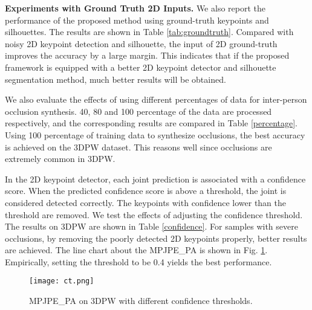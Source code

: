 \documentclass[journal]{IEEEtran}
\begin{document}
\noindent\textbf{Experiments with Ground Truth 2D Inputs.}  We also report the performance of the proposed method using ground-truth keypoints and silhouettes. The results are shown in Table \ref{tab:groundtruth}. Compared with noisy 2D keypoint detection and silhouette,  the input of 2D ground-truth improves the accuracy by a large margin. This indicates that if the proposed framework is equipped with a better 2D keypoint detector and silhouette segmentation method, much better results will be obtained.

We also evaluate the effects of using different percentages of data for inter-person occlusion synthesis. 40, 80 and 100 percentage of the data are processed respectively, and the corresponding results are compared in Table \ref{percentage}. Using 100 percentage of training data to synthesize occlusions, the best accuracy is achieved on the 3DPW dataset. This reasons well since occlusions are extremely common in 3DPW.

In the 2D keypoint detector, each joint prediction is associated with a confidence score. When the predicted confidence score is above a threshold, the joint is considered detected correctly. The keypoints with confidence lower than the threshold are removed. We test the effects of adjusting the confidence threshold.  The results on 3DPW are shown in Table \ref{confidence}.  For samples with severe occlusions, by removing the poorly detected 2D keypoints properly, better results are achieved. The line chart about the MPJPE\_PA is shown in Fig. \ref{fig:confidence}. Empirically, setting the threshold to be 0.4 yields the best performance.

\begin{figure}[htbp]
    \centerline{\texttt{[image: ct.png]}}
\caption{MPJPE\_PA on 3DPW with different confidence thresholds.}
    \label{fig:confidence}
\end{figure}
\end{document}
